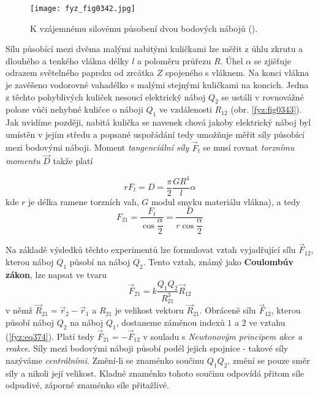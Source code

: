     \begin{figure}[ht!]  %
      \centering
      \texttt{[image: fyz\_fig0342.jpg]}
      \caption{K vzájemnému silovému působení dvou bodových nábojů (\cite[s.~294]{Feynman02}).}
      \label{fyz:fig0342}
    \end{figure}

    Sílu působící mezi dvěma malými nabitými kuličkami lze měřit z úhlu zkrutu a dlouhého a tenkého
    vlákna délky \(l\) a poloměru průřezu \(R\). Úhel \(\alpha\) se zjišťuje odrazem světelného
    paprsku od zrcátka \(Z\) spojeného s vláknem. Na konci vlákna je zavěšeno vodorovné vahadélko s
    malými stejnými kuličkami na koncich. Jedna z těchto pohyblivých kuliček nesoucí elektrický
    náboj \(Q_2\) se ustáli v rovnovážné poloze vůči nehybné kuličce o náboji \(Q_1\) ve vzdálenosti
    \(R_{12}\) (obr. \ref{fyz:fig0343}). Jak uvidíme později, nabitá kulička se navenek chová jakoby
    elektrický náboj byl umístěn v jejím středu a popsané uspořádání tedy umožňuje měřit síly
    působící mezi bodovými náboji. Moment \emph{tangenciální síly} \(\vec{F}_t\) se musí rovnat
    \emph{torznímu momentu} \(\vec{D}\) takže platí

    \begin{equation}\label{fyz:eq372}
      rF_t = D = \frac{\pi}{2}\frac{GR^4}{l}\alpha
    \end{equation}
    kde \(r\) je délka ramene torzních vah, \(G\) modul smyku materiálu vlákna), a tedy
    \begin{equation}\label{fyz:eq373}
      F_{21} = \dfrac{F_t}{\cos\dfrac{\alpha}{2}} = \dfrac{D}{r\cos\dfrac{\alpha}{2}}
    \end{equation}
    
    Na základě výsledků těchto experimentů lze formulovat vztah vyjadřující sílu \(\vec{F}_{12}\),
    kterou náboj \(Q_1\) působí na náboj \(Q_2\). Tento vztah, známý jako \textbf{Coulombúv zákon},
    lze napsat ve tvaru
    \begin{equation}\label{fyz:eq374}
      \vec{F}_{21} = k\frac{Q_1Q_2}{R_{21}^3}\vec{R}_{12}
    \end{equation}
    v němž \(\vec{R}_{21} = \vec{r}_2 - \vec{r}_1\) a \(R_{21}\) je velikost vektoru
    \(\vec{R}_{21}\). Obráceně sílu \(\vec{F}_{12}\), kterou působí náboj \(Q_2\) na náboj \(Q_1\),
    dostaneme záměnou indexů \(1\) a \(2\) ve vztahu (\ref{fyz:eq374}). Platí tedy \(\vec{F}_{21} =
    -\vec{F}_{12}\) v souladu s \emph{Newtonovým principem akce a reakce}. Síly mezi bodovými náboji
    působí podél jejich spojnice - takové síly nazýváme \emph{centrálními}. Změní-li se znaménko
    součinu \(Q_1Q_2\), změní se pouze směr síly a nikoli její velikost. Kladné znaménko tohoto
    součinu odpovídá přitom síle odpudivé, záporné znaménko síle přitažlivé. 
      
